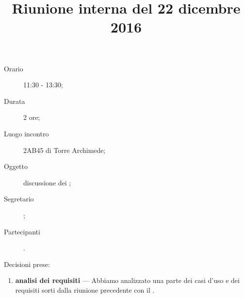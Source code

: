 


\author{\PB}
\supervisor{\MM}
\dest{\ALL}
\title{Riunione interna del 22 dicembre 2016}



\maketitle

\begin{description}
	\item[Orario] 11:30 - 13:30;
	\item[Durata] 2 ore;
	\item[Luogo incontro] 2AB45 di Torre Archimede;
	\item[Oggetto] discussione dei ;
	\item[Segretario] \PB;
	\item[Partecipanti] \ALL.
\end{description}

Decisioni prese:
\begin{enumerate}
	\item \textbf{analisi dei requisiti} --- Abbiamo analizzato una parte dei casi d'uso e dei requisiti sorti dalla riunione precedente con il \GP.
\end{enumerate}


